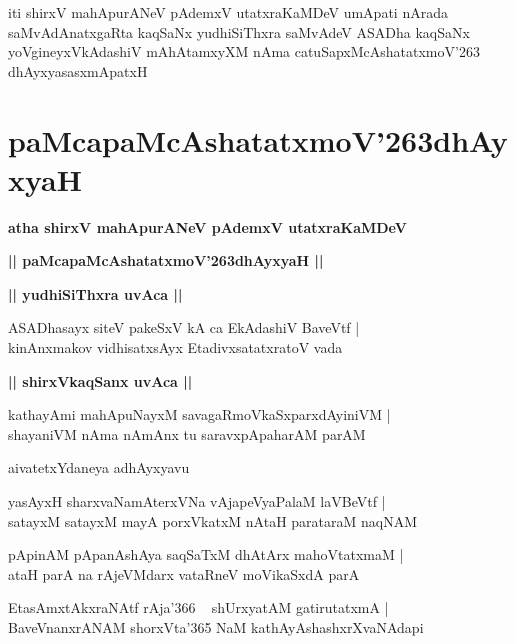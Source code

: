 \documentclass[twoside,12pt,openright]{book}
\def\S{\char'263}
\newcounter{shloka}[chapter]
\def\uvaca#1{\centerline{{\large\textbf{#1}}}}
\begin{document}
\begin{center}
iti shirxV mahApurANeV pAdemxV utatxraKaMDeV umApati nArada saMvAdAnatxgaRta kaqSaNx yudhiSiThxra 
saMvAdeV ASADha kaqSaNx yoVgineyxVkAdashiV mAhAtamxyXM nAma catuSapxMcAshatatxmoV\S 
dhAyxyasasxmApatxH
\end{center}

\chapter{paMcapaMcAshatatxmoV\S dhAyxyaH}

\begin{center}
{\LARGE\bfseries atha shirxV mahApurANeV pAdemxV utatxraKaMDeV}
\end{center}

\begin{center}
{\LARGE\bfseries || paMcapaMcAshatatxmoV\S dhAyxyaH ||}
\end{center}

\uvaca{|| yudhiSiThxra uvAca ||}

\begin{shloka}%
ASADhasayx siteV pakeSxV kA ca EkAdashiV BaveVtf |\\
kinAnxmakov vidhisatxsAyx EtadivxsatatxratoV vada 
\end{shloka}

\uvaca{|| shirxVkaqSanx uvAca ||}

\begin{shloka}%
kathayAmi mahApuNayxM savagaRmoVkaSxparxdAyiniVM |\\
shayaniVM nAma nAmAnx tu saravxpApaharAM parAM 
\end{shloka}

\begin{center}
aivatetxYdaneya adhAyxyavu
\end{center}

\begin{shloka}%
yasAyxH sharxvaNamAterxVNa vAjapeVyaPalaM laVBeVtf |\\
satayxM satayxM mayA porxVkatxM nAtaH parataraM naqNAM 
\end{shloka}

\begin{shloka}%
pApinAM pApanAshAya saqSaTxM dhAtArx mahoVtatxmaM |\\
ataH parA na rAjeVMdarx vataRneV moVikaSxdA parA 
\end{shloka}

\begin{shloka}%
EtasAmxtAkxraNAtf rAja\char'366 ~ shUrxyatAM gatirutatxmA |\\
BaveVnanxrANAM shorxVta\char'365 NaM kathAyAshashxrXvaNAdapi 
\end{shloka}
\end{document}
